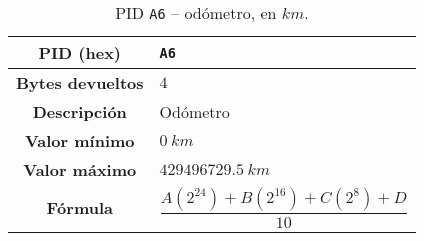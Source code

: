 \begin{table}[H]
  \centering
  \begin{tabularx}{\textwidth}{|c|X|}
    \hline
    \textbf{PID (hex)}       & \texttt{A6}                    \\
    \hline
    \textbf{Bytes devueltos} & $4$                            \\
    \hline
    \textbf{Descripción}     & Odómetro \\
    \hline
    \textbf{Valor mínimo}    & $0~km$                          \\
    \hline
    \textbf{Valor máximo}    & $429496729.5~km$                        \\
    \hline
    \textbf{Fórmula}         &                                %
    \begin{equation*}
      \frac{A\left(2^{24}\right) + B\left(2^{16}\right) + C\left(2^8\right) + D}{10}
    \end{equation*}                                 \\
    \hline
  \end{tabularx}
  \caption{\ac{PID} \texttt{A6} -- odómetro, en $km$.}
\end{table}
